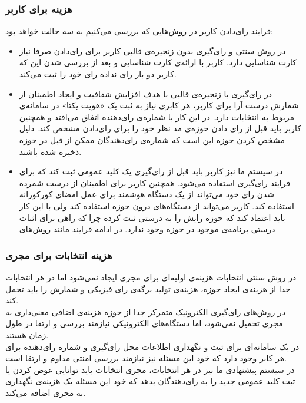 \subsubsection{هزینه برای کاربر}
فرایند رای‌دادن کاربر در روش‌هایی که بررسی می‌کنیم به سه حالت خواهد بود:
\begin{itemize}
 \item 
 در روش‌ سنتی و رای‌گیری بدون زنجیره‌ی قالبی کاربر برای رای‌دادن صرفا نیاز کارت شناسایی دارد. کاربر با ارائه‌ی کارت شناسایی و بعد از بررسی شدن این که کاربر دو بار رای نداده رای خود را ثبت می‌کند. 
 \item 
 در رای‌گیری با زنجیره‌ی قالبی با هدف افزایش شفافیت و ایجاد اطمینان از شمارش درست آرا برای کاربر، هر کابری نیاز به ثبت یک «هویت یکتا» در سامانه‌ی مربوط به انتخابات دارد. در  این کار با شماره‌ی رای‌‌دهنده اتفاق می‌افتد و همچنین کاربر باید قبل از رای‌ دادن حوزه‌ی مد نظر خود را برای رای‌دادن مشخص کند. دلیل مشخص کردن حوزه این است که شماره‌ی رای‌دهندگان ممکن از قبل در حوزه ذخیره شده باشند.
 
 \item
 در سیستم ما نیز کاربر باید قبل از رای‌گیری یک کلید عمومی ثبت کند که برای فرایند رای‌گیری استفاده می‌شود. همچنین کاربر برای اطمینان از درست شمرده شدن رای خود می‌تواند از یک دستگاه هوشمند برای عمل امضای کورکورانه استفاده کند. کاربر می‌تواند از دستگاه‌های درون حوزه استفاده کند ولی با این کار باید اعتماد کند که حوزه رایش را به درستی ثبت کرده چرا که راهی برای اثبات درستی برنامه‌ی موجود در حوزه وجود ندارد.
 در ادامه فرایند مانند روش‌های 
\end{itemize}
\subsubsection{هزینه انتخابات برای مجری}
در روش سنتی انتخابات هزینه‌ی اولیه‌ای برای مجری ایجاد نمی‌شود اما در هر انتخابات جدا از هزینه‌ی ایجاد حوزه، هزینه‌ی تولید برگه‌ی رای فیزیکی و شمارش را باید تحمل کند. 
\\
در روش‌های رای‌گیری الکترونیک متمرکز جدا از حوزه هزینه‌ی اضافی معنی‌داری به مجری تحمیل نمی‌شود، اما دستگا‌ه‌های الکترونیکی نیازمند بررسی و ارتقا در طول زمان هستند.
\\
در  یک سامانه‌ای برای ثبت و نگهداری اطلاعات محل رای‌گیری و شماره رای‌دهنده برای هر کابر وجود دارد که خود این مسئله نیز نیازمند بررسی امنتی مداوم و ارتقا است. 
\\
در سیستم پیشنهادی ما نیز در هر انتخابات، مجری انتخابات باید توانایی عوض کردن یا ثبت کلید عمومی جدید را به رای‌دهندگان بدهد که خود این مسئله یک هزینه‌ی نگهداری به مجری اضافه می‌کند. 
